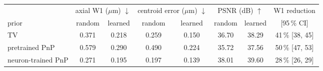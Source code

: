 \begin{tabular}{@{}l cc cc cc c@{}}\toprule
& \multicolumn{2}{c}{axial W1 ($\mu$m) $\downarrow$} & \multicolumn{2}{c}{centroid error ($\mu$m) $\downarrow$} & \multicolumn{2}{c}{PSNR (dB) $\uparrow$} & W1 reduction\\
\cmidrule(lr){2-3}\cmidrule(lr){4-5}\cmidrule(lr){6-7}
prior & random & learned & random & learned & random & learned & [95\,\% CI]\\\midrule
TV & 0.371 & 0.218 & 0.259 & 0.150 & 36.70 & 38.29 & 41\,\% [38, 45]\\
pretrained PnP & 0.579 & 0.290 & 0.490 & 0.224 & 35.72 & 37.56 & 50\,\% [47, 53]\\
neuron-trained PnP & 0.271 & 0.195 & 0.197 & 0.139 & 38.01 & 39.60 & 28\,\% [26, 29]\\
\bottomrule\end{tabular}
